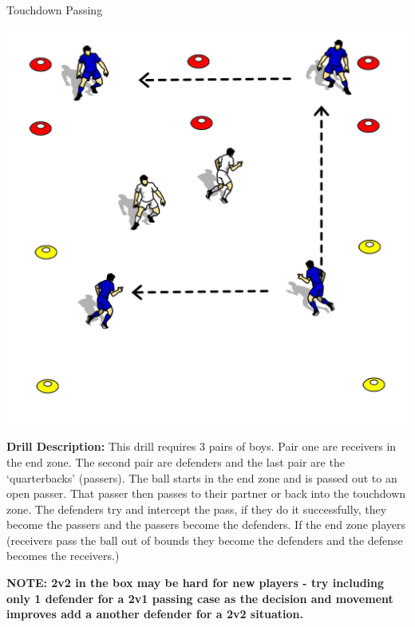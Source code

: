 \begin{evenBlock}{Touchdown Passing}
\begin{minipage}[t]{\linewidth}
    \begin{minipage}{.3\linewidth} %
        \centering
        \includegraphics[width=.7\textwidth]{../img/Trimmed/TouchDownPassing}
    \end{minipage}
    \hspace{0.05\linewidth}
    \begin{minipage}{.6\linewidth} %
        \textbf{Drill Description:}
        This drill requires 3 pairs of boys.  Pair one are receivers in the end zone.  The second pair are defenders and the last pair are the `quarterbacks' (passers).  The ball starts in the end zone and is passed out to an open passer.  That passer then passes to their partner or back into the touchdown zone. The defenders try and intercept the pass, if they do it successfully, they become the passers and the passers become the defenders.  If the end zone players (receivers pass the ball out of bounds they become the defenders and the defense becomes the receivers.)

        \textbf{NOTE: 2v2 in the box may be hard for new players - try including only 1 defender for a 2v1 passing case as the decision and movement improves add a another defender for a 2v2 situation.}


\end{minipage}
\end{minipage}
\end{evenBlock}
